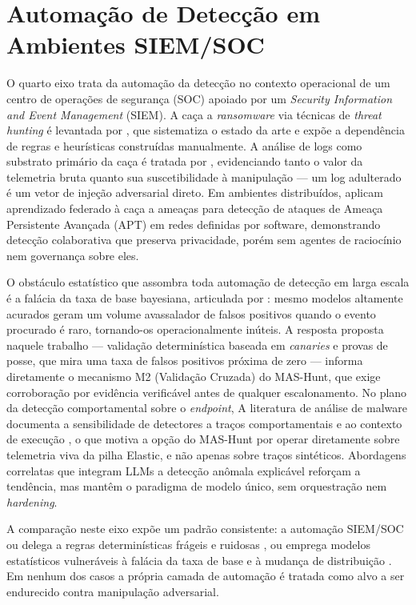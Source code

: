 \section{Automação de Detecção em Ambientes SIEM/SOC}
\label{sec:rel-siem-soc}

O quarto eixo trata da automação da detecção no contexto operacional de um centro
de operações de segurança (SOC) apoiado por um \textit{Security Information and
Event Management} (SIEM). A caça a \textit{ransomware} via técnicas de
\textit{threat hunting} é levantada por , que sistematiza o
estado da arte e expõe a dependência de regras e heurísticas construídas
manualmente. A análise de logs como substrato primário da caça é tratada por
, evidenciando tanto o valor da telemetria bruta quanto sua
suscetibilidade à manipulação --- um log adulterado é um vetor de injeção
adversarial direto. Em ambientes distribuídos,  aplicam
aprendizado federado à caça a ameaças para detecção de ataques de Ameaça
Persistente Avançada (APT) em redes definidas por software, demonstrando
detecção colaborativa que preserva privacidade, porém sem agentes de raciocínio
nem governança sobre eles.

O obstáculo estatístico que assombra toda automação de detecção em larga escala é
a falácia da taxa de base bayesiana, articulada por :
mesmo modelos altamente acurados geram um volume avassalador de falsos positivos
quando o evento procurado é raro, tornando-os operacionalmente inúteis. A resposta
proposta naquele trabalho --- validação determinística baseada em \textit{canaries}
e provas de posse, que mira uma taxa de falsos positivos próxima de zero ---
informa diretamente o mecanismo M2 (Validação Cruzada) do MAS-Hunt, que exige
corroboração por evidência verificável antes de qualquer escalonamento. No plano
da detecção comportamental sobre o \textit{endpoint},
A literatura de análise de malware documenta a sensibilidade de detectores a
traços comportamentais e ao contexto de execução \cite{ucci2019}, o que motiva a
opção do MAS-Hunt por operar diretamente sobre telemetria viva da pilha Elastic,
e não apenas sobre traços sintéticos. Abordagens correlatas que integram LLMs a
detecção anômala explicável \cite{ali2023huntgptintegratingmachinelearningbased}
reforçam a tendência, mas mantêm o paradigma de modelo único, sem orquestração
nem \textit{hardening}.

A comparação neste eixo expõe um padrão consistente: a automação SIEM/SOC ou
delega a regras determinísticas frágeis e ruidosas \cite{9791234,10616474}, ou
emprega modelos estatísticos vulneráveis à falácia da taxa de base
\cite{dolan-gavitt2025} e à mudança de distribuição \cite{ucci2019}. Em
nenhum dos casos a própria camada de automação é tratada como alvo a ser
endurecido contra manipulação adversarial.

